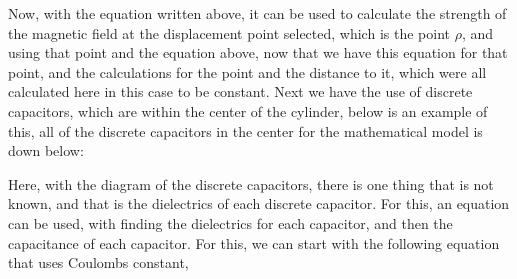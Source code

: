 \documentclass[]{article}
\begin{document}
Now, with the equation written above, it can be used to calculate the strength of the magnetic field at the displacement point selected, which is the point $\rho$, and using that point and the equation above, now that we have this equation for that point, and the calculations for the point and the distance to it, which were all calculated here in this case to be constant. Next we have the use of discrete capacitors, which are within the center of the cylinder, below is an example of this, all of the discrete capacitors in the center for the mathematical model is down below: 
\linebreak
\linebreak
{}
\linebreak
\linebreak
Here, with the diagram of the discrete capacitors, there is one thing that is not known, and that is the dielectrics of each discrete capacitor. For this, an equation can be used, with finding the dielectrics for each capacitor, and then the capacitance of each capacitor. For this, we can start with the following equation that uses Coulombs constant,
\end{document}
